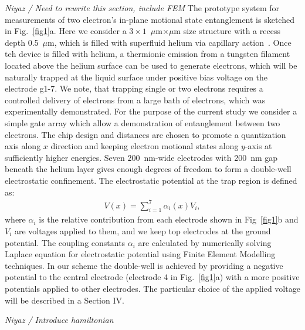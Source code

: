 \documentclass[twocolumn,superscriptaddress,unsortedaddress,
 amsmath,amssymb,
 aps,
]{revtex4-2}
\begin{document}
\textit{Niyaz / Need to rewrite this section, include FEM} The prototype system for measurements of two electron's in-plane motional state entanglement is sketched in Fig.~\ref{fig1}a. Here we consider a $3 \times 1$~$\mu$m$\times\mu$m size structure with a recess depth 0.5~$\mu$m, which is filled with superfluid helium via capillary action~\cite{marty1986stability}. Once teh device is filled with helium, a thermionic emission from a tungsten filament located above the helium surface can be used to generate electrons, which will be naturally trapped at the liquid surface under positive bias voltage on the electrode g1-7. We note, that trapping single or two electrons requires a controlled delivery of electrons from a large bath of electrons, which was experimentally demonstrated. For the purpose of the current study we consider a simple gate array which allow a demonstration of entanglement between two electrons. The chip design and distances are chosen to promote a quantization axis along $x$ direction and keeping electron motional states along $y$-axis at sufficiently higher energies. Seven 200~nm-wide electrodes with 200~nm gap beneath the helium layer gives enough degrees of freedom to form a double-well electrostatic confinement. The electrostatic potential at the trap region is defined as:
\begin{align}
            V(x) = \sum_{i=1}^7 \alpha_i(x) V_i,
            \label{eq:trap}
\end{align}
where $\alpha_i$ is the relative contribution from each electrode shown in Fig~\ref{fig1}b and $V_i$ are voltages applied to them, and we keep top electrodes at the ground potential. The coupling constants $\alpha_i$ are calculated by numerically solving Laplace equation for electrostatic potential using Finite Element Modelling techniques. In our scheme the double-well is achieved by providing a negative potential to the central electrode (electrode 4 in Fig.~\ref{fig1}a) with a more positive potentials applied to other electrodes. The particular choice of the applied voltage will be described in a Section IV.

\textit{Niyaz / Introduce hamiltonian}
\end{document}
